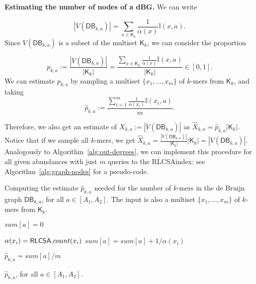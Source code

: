\documentclass[a4paper,11pt]{article}
\newcommand{\DB}{\mathsf{DB}_{k,a}}
\newcommand{\K}{\mathsf{K}}
\newcommand{\abu}{\alpha}
\newcommand{\RLCSA}{{\sf RLCSA}}
\renewcommand{\geq}{\geqslant}
\begin{document}

\noindent \textbf{Estimating the number of nodes of a dBG.} We can write

\[|V(\DB)| = \sum_{x \in \K_k} \frac{1}{\abu(x)}\mathbb{I}(x,a).\]
Since $V(\DB)$ is a subset of the multiset $\K_k$, we can consider the proportion 

\[p_{k,a} := \frac{|V(\DB)|}{|\K_k|} = \frac{\sum_{x \in \K_k} \frac{1}{\abu(x)}\mathbb{I}(x,a)}{|\K_k|} \in [0,1].\]
%
%
We can estimate $p_{k,a}$ by sampling a multiset $\{x_1,\dots,x_m\}$ of $k$-mers from $\K_k$, and taking
\[\hat{p}_{k,a} := \frac{\sum_{i = 1}^m \frac{1}{\abu(x_i)}\mathbb{I}(x_i, a)}{m}.\]

Therefore, we also get an estimate of $X_{k,a} := |V(\DB)|$ as $\hat{X}_{k,a} = \hat{p}_{k,a}|\K_k|$. Notice that if we sample all $k$-mers, we get $\hat{X}_{k,a} = \frac{|V(\DB)|}{|\K_k|}|\K_k| = |V(\DB)|$. Analogously to Algorithm~\ref{alg:out-degrees}, we can implement this procedure for all given abundances with just $m$ queries to the \RLCSA index: see Algorithm~\ref{alg:graph-nodes} for a pseudo-code.


\begin{algorithm}[h]
\caption{Computing the estimate $\hat{p}_{k,a}$ needed for the number of $k$-mers in the de Bruijn graph $\DB$, for all $a \in [A_1,A_2]$. The input is also a multiset $\{x_1,\dots,x_m\}$ of $k$-mers from $\K_k$.\label{alg:graph-nodes}}

{
	$sum[a] = 0$\;
}

{
	$\abu(x_i) = \RLCSA.count(x_i)$\;
	\For{$a = A_1$ {\rm\bf to} $\min(\abu(x_i),A_2)$}
	{
		$sum[a] = sum[a] + 1 / \abu(x_i)$\;
	}
}

{
	$\hat{p}_{k,a} = sum[a]/m$\;
}

\Return $\hat{p}_{k,a}$, for all $a \in [A_1,A_2]$.
\end{algorithm}
\end{document}
